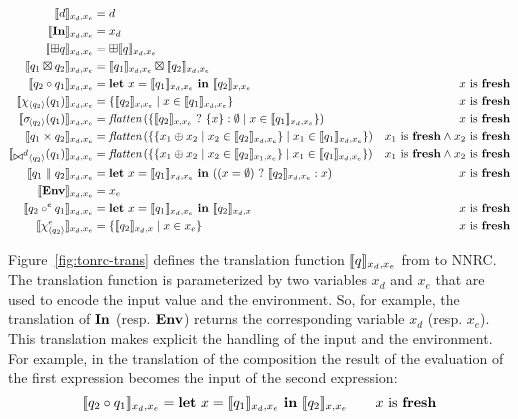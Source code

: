 \begin{figure*}[th]
  \centering
  \begin{align*}
    \nton{x_{d},x_{e}}{d} &= d\\
    \nton{x_{d},x_{e}}{\qID} &= x_{d}\\
    \nton{x_{d},x_{e}}{\opunop q} &= \opunop \nton{x_{d},x_{e}}{q}\\
    \nton{x_{d},x_{e}}{q_1\opbinop q_2} &= \nton{x_{d},x_{e}}{q_1}\opbinop\nton{x_{d},x_{e}}{q_2}\\
    \nton{x_{d},x_{e}}{q_2\circ q_1} &= \elet{x}{\nton{x_{d},x_{e}}{q_1}}{\nton{x,x_{e}}{q_2}}&x\textrm{ is }\nfresh\\
    \nton{x_{d},x_{e}}{\qmap{q_2}{q_1}} &= \efor{x}{\nton{x_{d},x_{e}}{q_1}}{\nton{x,x_{e}}{q_2}}&x\textrm{ is }\nfresh\\
    \nton{x_{d},x_{e}}{\qselect{q_2}{q_1}} &=\opflatten\left(\efor{x}{\nton{x_{d},x_{e}}{q_1}}{\eif{\nton{x,x_{e}}{q_2}}{\{x\}}{\emptyset}}\right) &x\textrm{ is }\nfresh\\
    \nton{x_{d},x_{e}}{q_1\times q_2} &=
    \opflatten\left(\efor{x_1}{\nton{x_{d},x_{e}}{q_1}}{\efor{x_2}{\nton{x_{d},x_{e}}{q_2}}{x_1 \opconcat x_2}}\right)&x_1\textrm{ is }\nfresh\land x_2\textrm{ is }\nfresh\\
    \nton{x_{d},x_{e}}{\qdjoin{q_2}{q_1}} &=
    \opflatten\left(\efor{x_1}{\nton{x_{d},x_{e}}{q_1}}{\efor{x_2}{\nton{x_1,x_{e}}{q_2}}{x_1 \opconcat x_2}}\right)&x_1\textrm{ is }\nfresh\land x_2\textrm{ is }\nfresh\\
    \nton{x_{d},x_{e}}{q_1~\qor~q_2} &= \elet{x}{\nton{x_{d},x_{e}}{q_1}}{\left(\eif{\left(x=\emptyset\right)}{\nton{x_{d},x_{e}}{q_2}}{x}\right)}&x\textrm{ is }\nfresh\\
    \nton{x_{d},x_{e}}{\qENV} &= x_{e}\\
    \nton{x_{d},x_{e}}{q_2\circ^e q_1} &= \elet{x}{\nton{x_{d},x_{e}}{q_1}}{\nton{x_{d},x}{q_2}}&x\textrm{ is }\nfresh\\
    \nton{x_{d},x_{e}}{\qmapenv{q_2}} &= \efor{x}{x_{e}}{\nton{x_{d},x}{q_2}}&x\textrm{ is }\nfresh
  \end{align*}
  \caption{From \NRAEnv to NNRC\,. \qquad {}}
  \label{fig:tonrc-trans}
\end{figure*}

Figure~\ref{fig:tonrc-trans} defines the translation function
$\nton{x_{d},x_{e}}{q}$ from \NRAEnv to
NNRC.
%
The translation function is parameterized by two variables $x_{d}$ and
$x_{e}$ that are used to encode the input value and the environment.
%
So, for example, the translation of $\qID$ (resp. $\qENV$) returns the
corresponding variable $x_{d}$ (resp. $x_{e}$). This translation makes
explicit the handling of the input and the environment. For example,
in the translation of the composition the result of the evaluation of
the first expression becomes the input of the second expression:
$$
\nton{x_{d},x_{e}}{q_2\circ q_1} = \elet{x}{\nton{x_{d},x_{e}}{q_1}}{\nton{x,x_{e}}{q_2}} \qquad x\textrm{ is }\nfresh
$$

